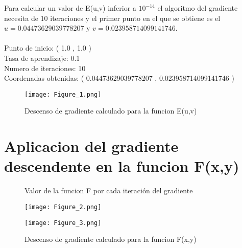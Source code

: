 Para calcular un valor de E(u,v) inferior a $ 10^{-14} $ el algoritmo del gradiente necesita de 10 iteraciones y el primer punto en el que se obtiene es el $ u =  0.04473629039778207 $ y $ v =  0.023958714099141746 $.\\
\\
Punto de inicio: ( 1.0 ,  1.0 )\\
Tasa de aprendizaje:  0.1\\
Numero de iteraciones:  10\\
Coordenadas obtenidas: ( 0.04473629039778207 ,  0.023958714099141746 )\\

\begin{figure}[h]
   \caption{Descenso de gradiente calculado para la funcion E(u,v)}
   \centering
   \texttt{[image: Figure\_1.png]}
\end{figure}

\section{Aplicacion del gradiente descendente en la funcion F(x,y)}

\begin{figure}[h]
   \centering
   \caption{Valor de la funcion F por cada iteración del gradiente}
   \texttt{[image: Figure\_2.png]}
   \centering
   \caption{Descenso de gradiente calculado para la funcion F(x,y)}
   \texttt{[image: Figure\_3.png]}
\end{figure}

\begin{table}[h]
\centering
{}
\end{table}

